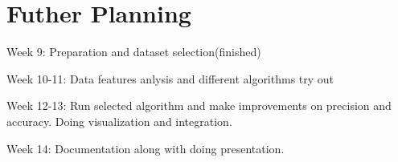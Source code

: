 \documentclass{sig-alternate}
\begin{document}
\section{Futher Planning}
Week 9: Preparation and dataset selection(finished)

Week 10-11: Data features anlysis and different algorithms try out

Week 12-13: Run selected algorithm and make improvements on precision and accuracy. Doing visualization and integration.

Week 14: Documentation along with doing presentation. 
\end{document}
